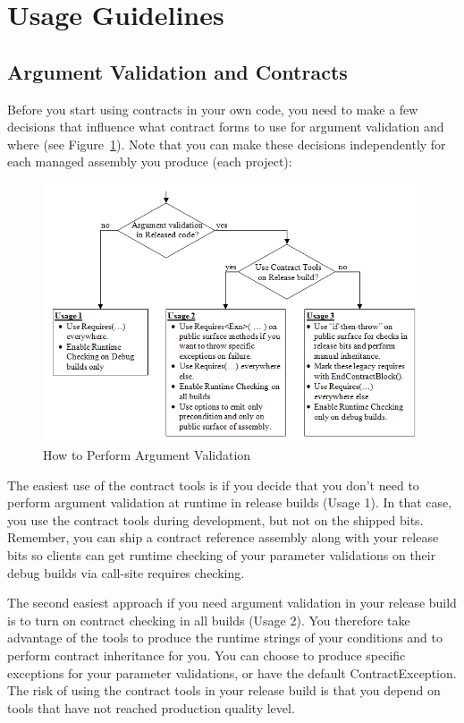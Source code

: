 \documentclass{article}
\begin{document}
\section{Usage Guidelines}
\label{sec:guidelines}

\subsection{Argument Validation and Contracts}
\label{sec:usage}

Before you start using contracts in your own code, you need to make a
few decisions that influence what contract forms to use for argument
validation and where (see Figure~\ref{fig:usagedecision}). Note that
you can make these decisions independently for each managed assembly
you produce (each project):

\begin{figure}[htb!]
\begin{center}
  \includegraphics[width=\columnwidth]{UsageDecision.png}
\end{center}
  \caption{How to Perform Argument Validation}
  \label{fig:usagedecision}
\end{figure}

The easiest use of the contract tools is if you decide that you don't
need to perform argument validation at runtime in release builds
(Usage 1). In that case, you use the contract tools during
development, but not on the shipped bits. Remember, you can ship a
contract reference assembly along with your release bits so clients
can get runtime checking of your parameter validations on their debug
builds via call-site requires checking. 

The second easiest approach if you need argument validation in your
release build is to turn on contract checking in all builds (Usage
2). You therefore take advantage of the tools to produce the runtime
strings of your conditions and to perform contract inheritance for
you. You can choose to produce specific exceptions for your parameter
validations, or have the default ContractException. The risk of using
the contract tools in your release build is that you depend on tools
that have not reached production quality level. 
\end{document}
